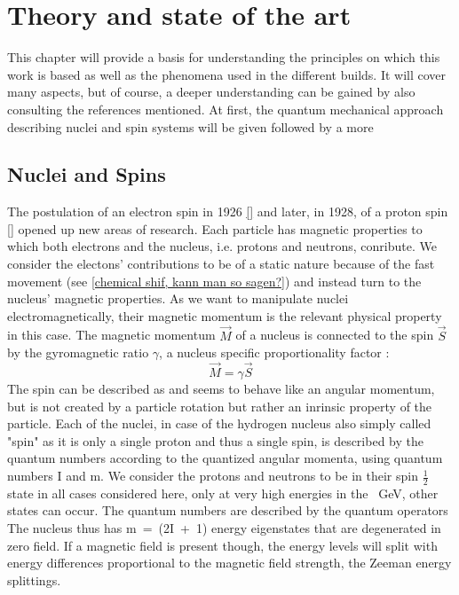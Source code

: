 \chapter{Theory and state of the art}\label{chap:theory}
This chapter will provide a basis for understanding the principles on which this work is based as well as the phenomena used in the different builds. It will cover many aspects, but of course, a deeper understanding can be gained by also consulting the references mentioned. At first, the quantum mechanical approach describing nuclei and spin systems will be given followed by a more 
    \section{Nuclei and Spins}
        \label{theory:section:nucleiSpins}
        The postulation of an electron spin in 1926 \ref{} and later, in 1928, of a proton spin \ref{} opened
        up new areas of research.
        Each particle has magnetic properties to which both electrons and the nucleus, i.e. protons and neutrons, conribute. We consider the electons' contributions to be of a static nature because of the fast movement (see \ref{chemical shif, kann man so sagen?}) and instead turn to the nucleus' magnetic properties. As we want to manipulate nuclei electromagnetically, their magnetic momentum is the relevant physical property in this case.
        The magnetic momentum $\vec M$ of a nucleus is connected to the spin $\vec S$ by the gyromagnetic ratio $\gamma$, a nucleus specific proportionality factor \cite{balanis_advanced_nodate}:
        \begin{equation}
            \vec M = \gamma \vec S
            \label{eq:gyromagneticRatio}
        \end{equation}
        The spin can be described as and seems to behave like an angular momentum, but is not created by a particle rotation but rather an inrinsic property of the particle. Each of the nuclei, in case of the hydrogen nucleus also simply called "spin" as it is only a single proton and thus a single spin, is described by the quantum numbers according to the quantized angular momenta, using quantum numbers I and m. We consider the protons and neutrons to be in their spin $\tfrac{1}{2}$ state in all cases considered here, only at very high energies in the \SI{}{\giga\electronvolt}, other states can occur. The quantum numbers are described by the quantum operators   The nucleus thus has m~=~(2I~+~1) energy eigenstates that are degenerated in zero field. If a magnetic field is present though, the energy levels will split with energy differences proportional to the magnetic field strength, the Zeeman energy splittings.
